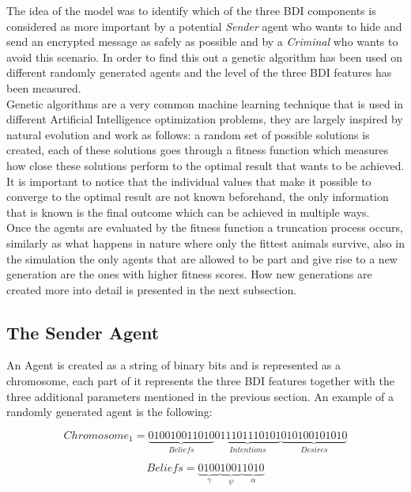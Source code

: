 \documentclass[a4paper]{article}
\begin{document}
The idea of the model was to identify which of the three BDI components is considered as more important by a potential \textit{Sender} agent who wants to hide and send an encrypted message as safely as possible and by a \textit{Criminal} who wants to avoid this scenario. In order to find this out a genetic algorithm has been used on different randomly generated agents and the level of the three BDI features has been measured. \\
Genetic algorithms are a very common machine learning technique that is used in different Artificial Intelligence optimization problems, they are largely inspired by natural evolution and work as follows: a random set of possible solutions is created, each of these solutions goes through a fitness function which measures how close these solutions perform to the optimal result that wants to be achieved. It is important to notice that the individual values that make it possible to converge to the optimal result are not known beforehand, the only information that is known is the final outcome which can be achieved in multiple ways.\\
Once the agents are evaluated by the fitness function a truncation process occurs, similarly as what happens in nature where only the fittest animals survive, also in the simulation the only agents that are allowed to be part and give rise to a new generation are the ones with higher fitness scores. How new generations are created more into detail is presented in the next subsection.


\subsection{The Sender Agent}

An Agent is created as a string of binary bits and is represented as a chromosome, each part of it represents the three BDI features together with the three additional parameters mentioned in the previous section. An example of a randomly generated agent is the following:

\begin{equation}
	Chromosome_1 = \underbrace{010010011010}_{Beliefs}\underbrace{011101110101}_{Intentions}\underbrace{010100101010}_{Desires}
\end{equation}

\begin{equation}
	Beliefs = \underbrace{0100}_{\gamma} \underbrace{1001}_{\psi} \underbrace{1010}_{\alpha} 
\end{equation}  
\end{document}
